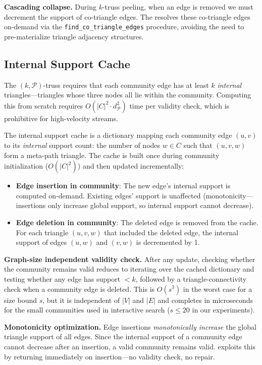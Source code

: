 \textbf{Cascading collapse.} During $k$-truss peeling, when an edge is removed we must decrement the support of co-triangle edges. The \mtindex resolves these co-triangle edges on-demand via the \texttt{find\_co\_triangle\_edges} procedure, avoiding the need to pre-materialize triangle adjacency structures.

\subsection{Internal Support Cache}

The $(k,\mathcal{P})$-truss requires that each community edge has at least $k$ \emph{internal} triangles---triangles whose three nodes all lie within the community. Computing this from scratch requires $O(|C|^2 \cdot d_{\mathcal{P}}^2)$ time per validity check, which is prohibitive for high-velocity streams.

The internal support cache is a dictionary mapping each community edge $(u,v)$ to its \emph{internal} support count: the number of nodes $w \in C$ such that $(u,v,w)$ form a meta-path triangle. The cache is built once during community initialization ($O(|C|^2)$) and then updated incrementally:

\begin{itemize}
\item \textbf{Edge insertion in community}: The new edge's internal support is computed on-demand. Existing edges' support is unaffected (monotonicity---insertions only increase global support, so internal support cannot decrease).
\item \textbf{Edge deletion in community}: The deleted edge is removed from the cache. For each triangle $(u,v,w)$ that included the deleted edge, the internal support of edges $(u,w)$ and $(v,w)$ is decremented by 1.
\end{itemize}

\textbf{Graph-size independent validity check.} After any update, checking whether the community remains valid reduces to iterating over the cached dictionary and testing whether any edge has support $< k$, followed by a triangle-connectivity check when a community edge is deleted. This is $O(s^3)$ in the worst case for a size bound $s$, but it is independent of $|V|$ and $|E|$ and completes in microseconds for the small communities used in interactive search ($s \leq 20$ in our experiments).

\textbf{Monotonicity optimization.} Edge insertions \emph{monotonically increase} the global triangle support of all edges. Since the internal support of a community edge cannot decrease after an insertion, a valid community remains valid. \DynaSCSH exploits this by returning immediately on insertion---no validity check, no repair.

